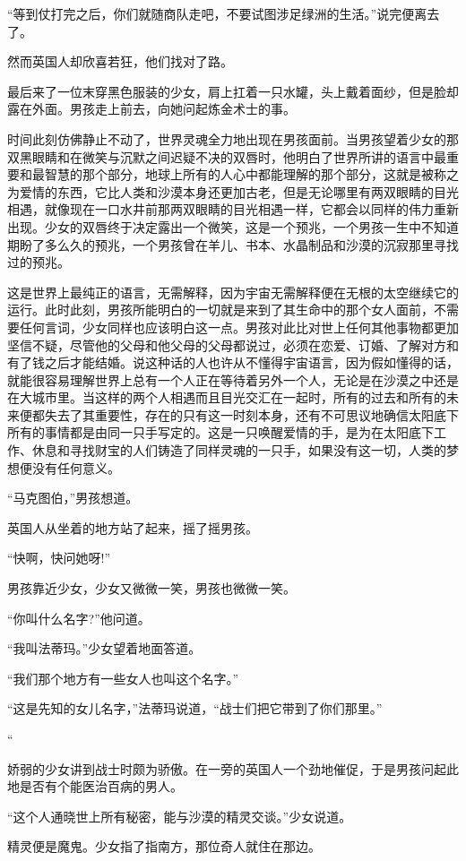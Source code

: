 \documentclass[twoside,openany]{book}
\begin{document}
“等到仗打完之后，你们就随商队走吧，不要试图涉足绿洲的生活。”说完便离去了。

然而英国人却欣喜若狂，他们找对了路。

最后来了一位末穿黑色服装的少女，肩上扛着一只水罐，头上戴着面纱，但是脸却露在外面。男孩走上前去，向她问起炼金术士的事。

时间此刻仿佛静止不动了，世界灵魂全力地出现在男孩面前。当男孩望着少女的那双黑眼睛和在微笑与沉默之间迟疑不决的双唇时，他明白了世界所讲的语言中最重要和最智慧的那个部分，地球上所有的人心中都能理解的那个部分，这就是被称之为爱情的东西，它比人类和沙漠本身还更加古老，但是无论哪里有两双眼睛的目光相遇，就像现在一口水井前那两双眼睛的目光相遇一样，它都会以同样的伟力重新出现。少女的双唇终于决定露出一个微笑，这是一个预兆，一个男孩一生中不知道期盼了多么久的预兆，一个男孩曾在羊儿、书本、水晶制品和沙漠的沉寂那里寻找过的预兆。

这是世界上最纯正的语言，无需解释，因为宇宙无需解释便在无根的太空继续它的运行。此时此刻，男孩所能明白的一切就是来到了其生命中的那个女人面前，不需要任何言词，少女同样也应该明白这一点。男孩对此比对世上任何其他事物都更加坚信不疑，尽管他的父母和他父母的父母都说过，必须在恋爱、订婚、了解对方和有了钱之后才能结婚。说这种话的人也许从不懂得宇宙语言，因为假如懂得的话，就能很容易理解世界上总有一个人正在等待着另外一个人，无论是在沙漠之中还是在大城市里。当这样的两个人相遇而且目光交汇在一起时，所有的过去和所有的未来便都失去了其重要性，存在的只有这一时刻本身，还有不可思议地确信太阳底下所有的事情都是由同一只手写定的。这是一只唤醒爱情的手，是为在太阳底下工作、休息和寻找财宝的人们铸造了同样灵魂的一只手，如果没有这一切，人类的梦想便没有任何意义。

“马克图伯，”男孩想道。

英国人从坐着的地方站了起来，摇了摇男孩。

“快啊，快问她呀!”

男孩靠近少女，少女又微微一笑，男孩也微微一笑。

“你叫什么名字?”他问道。

“我叫法蒂玛。”少女望着地面答道。

“我们那个地方有一些女人也叫这个名字。”

“这是先知的女儿名字，”法蒂玛说道，“战士们把它带到了你们那里。”

“

娇弱的少女讲到战士时颇为骄傲。在一旁的英国人一个劲地催促，于是男孩问起此地是否有个能医治百病的男人。

“这个人通晓世上所有秘密，能与沙漠的精灵交谈。”少女说道。

精灵便是魔鬼。少女指了指南方，那位奇人就住在那边。
\end{document}
